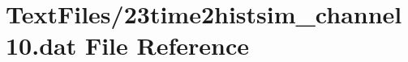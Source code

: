 \hypertarget{23time2histsim__channel10_8dat}{}\section{Text\+Files/23time2histsim\+\_\+channel10.dat File Reference}
\label{23time2histsim__channel10_8dat}
